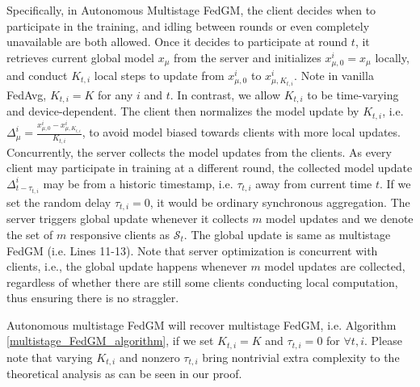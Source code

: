 Specifically, in Autonomous Multistage FedGM, the client decides when to participate in the training, and idling between rounds or even completely unavailable are both allowed. Once it decides to participate at round $t$, it retrieves current global model $x_\mu$ from the server and initializes $x_{\mu,0}^i=x_\mu$ locally, and conduct $K_{t,i}$ local steps to update from $x_{\mu,0}^i$ to $x^i_{\mu,K_{t,i}}$. Note in vanilla FedAvg, $K_{t,i}=K$ for any $i$ and $t$. In contrast, we allow $K_{t,i}$ to be time-varying and device-dependent. The client then normalizes the model update by $K_{t,i}$, i.e. $\Delta_\mu^i=\frac{x_{\mu,0}^i-x_{\mu,K_{t,i}}^i}{K_{t,i}}$, to avoid model biased towards clients with more local updates. Concurrently, the server collects the model updates from the clients. As every client may participate in training at a different round, the collected model update $\Delta_{t-\tau_{t,i}}^i$ may be from a historic timestamp, i.e. $\tau_{t,i}$ away from current time $t$. If we set the random delay $\tau_{t,i}=0$, it would be ordinary synchronous aggregation. The server triggers global update whenever it collects $m$ model updates and we denote the set of $m$ responsive clients as $\mathcal{S}_t$. The global update is same as multistage FedGM (i.e. Lines 11-13). Note that server optimization is concurrent with clients, i.e., the global update happens whenever $m$ model updates are collected, regardless of whether there are still some clients conducting local computation, thus ensuring there is no straggler.


Autonomous multistage FedGM will recover multistage FedGM, i.e. Algorithm \ref{multistage_FedGM_algorithm}, if we set $K_{t,i}=K$ and $\tau_{t,i}=0$ for $\forall t, i$. Please note that varying $K_{t,i}$ and nonzero $\tau_{t,i}$ bring nontrivial extra complexity to the theoretical analysis as can be seen in our proof.

\fi


